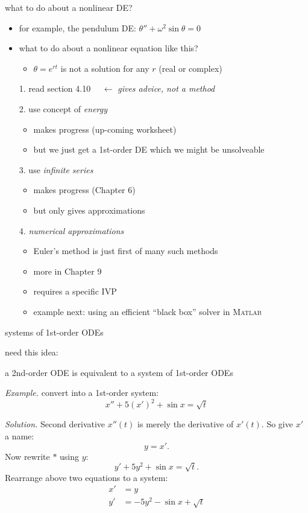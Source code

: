 \documentclass[dvipsnames,colorlinks]{beamer}
\newcommand{\Matlab}{\textsc{Matlab}\xspace}
\begin{document}
\begin{frame}{what to do about a nonlinear DE?}

\begin{itemize}
\item for example, the pendulum DE: \quad $\theta'' + \omega^2 \sin\theta = 0$
\item what to do about a nonlinear equation like this?
    \begin{itemize}
    \item $\theta=e^{rt}$ is not a solution for any $r$ (real or complex)
    \end{itemize}
\item[1.] \alert{read section 4.10}  $\quad \longleftarrow$ \emph{gives advice, not a method}
\item[2.] use concept of \emph{energy}
    \begin{itemize}
    \item makes progress (up-coming worksheet)
    \item but we just get a 1st-order DE which we might be unsolveable
    \end{itemize}
\item[3.] use \emph{infinite series}
    \begin{itemize}
    \item makes progress (Chapter 6)
    \item but only gives approximations
    \end{itemize}
\item[4.] \emph{numerical approximations}
    \begin{itemize}
    \item Euler's method is just first of many such methods
    \item more in Chapter 9
    \item requires a specific IVP
    \item example next: using an efficient ``black box'' solver in \footnotesize \Matlab
    \end{itemize}
\end{itemize}
\end{frame}


\begin{frame}{systems of 1st-order ODEs}

\medskip
need this idea:

   \centerline{\alert{a 2nd-order ODE is equivalent to a system of 1st-order ODEs}}

\bigskip
\noindent \emph{Example.} convert into a 1st-order system:
    $$x''+5(x')^2+\sin x = \sqrt{t}$$

\noindent \emph{Solution.}  Second derivative $x''(t)$ is merely the derivative of $x'(t)$.  So give $x'$ a name:
    $$y = x'.$$
Now rewrite $\ast$ using $y$:
    $$y' + 5 y^2 + \sin x = \sqrt{t}.$$
Rearrange above two equations to a system:
\begin{align*}
x' &= y \\
y' &= - 5 y^2 - \sin x + \sqrt{t}
\end{align*}
\end{frame}
\end{document}
